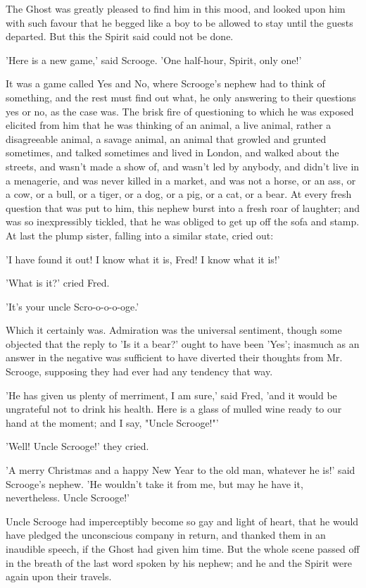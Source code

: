 The Ghost was greatly pleased to find him in this mood, and looked upon
him with such favour that he begged like a boy to be allowed to stay
until the guests departed. But this the Spirit said could not be done.

'Here is a new game,' said Scrooge. 'One half-hour, Spirit, only one!'

It was a game called Yes and No, where Scrooge's nephew had to think of
something, and the rest must find out what, he only answering to their
questions yes or no, as the case was. The brisk fire of questioning to
which he was exposed elicited from him that he was thinking of an
animal, a live animal, rather a disagreeable animal, a savage animal, an
animal that growled and grunted sometimes, and talked sometimes and
lived in London, and walked about the streets, and wasn't made a show
of, and wasn't led by anybody, and didn't live in a menagerie, and was
never killed in a market, and was not a horse, or an ass, or a cow, or a
bull, or a tiger, or a dog, or a pig, or a cat, or a bear. At every
fresh question that was put to him, this nephew burst into a fresh roar
of laughter; and was so inexpressibly tickled, that he was obliged to
get up off the sofa and stamp. At last the plump sister, falling into a
similar state, cried out:

'I have found it out! I know what it is, Fred! I know what it is!'

'What is it?' cried Fred.

'It's your uncle Scro-o-o-o-oge.'

Which it certainly was. Admiration was the universal sentiment, though
some objected that the reply to 'Is it a bear?' ought to have been
'Yes'; inasmuch as an answer in the negative was sufficient to have
diverted their thoughts from Mr. Scrooge, supposing they had ever had
any tendency that way.

'He has given us plenty of merriment, I am sure,' said Fred, 'and it
would be ungrateful not to drink his health. Here is a glass of mulled
wine ready to our hand at the moment; and I say, "Uncle Scrooge!"'

'Well! Uncle Scrooge!' they cried.

'A merry Christmas and a happy New Year to the old man, whatever he is!'
said Scrooge's nephew. 'He wouldn't take it from me, but may he have it,
nevertheless. Uncle Scrooge!'

Uncle Scrooge had imperceptibly become so gay and light of heart, that
he would have pledged the unconscious company in return, and thanked
them in an inaudible speech, if the Ghost had given him time. But the
whole scene passed off in the breath of the last word spoken by his
nephew; and he and the Spirit were again upon their travels.

